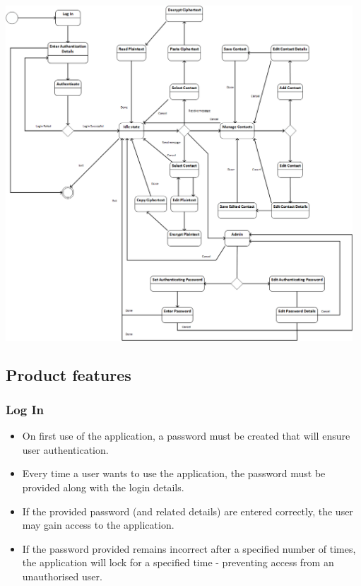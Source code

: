 \begin{center}
 \includegraphics[width=13cm]{diagrams/StateDiagrams/SMSEncryptionStateMachine.png}
\end{center}


\subsection{Product features}
\subsubsection{Log In}
\begin{itemize}
\item On first use of the application, a password must be created that will ensure user authentication.
\item Every time a user wants to use the application, the password must be provided along with the login details.
\item If the provided password (and related details) are entered correctly, the user may gain access to the application.
\item If the password provided remains incorrect after a specified number of times, the application will lock for a specified time - preventing access from an unauthorised user.
\end{itemize}
